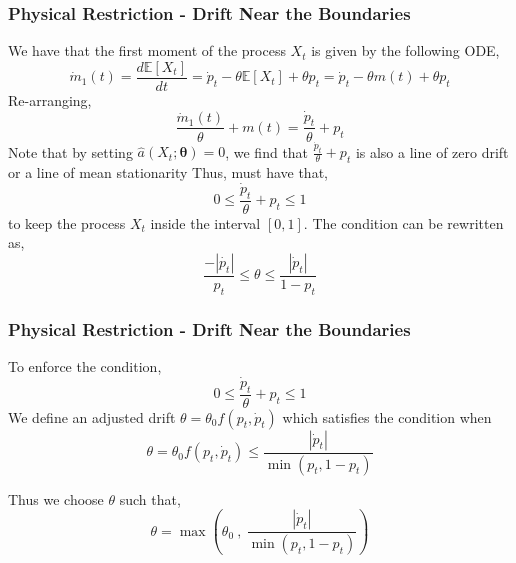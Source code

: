 \documentclass[aspectratio=169]{beamer}\usepackage[utf8]{inputenc}
\newcommand{\E}{\mathbb{E}}
\begin{document}
\begin{frame}\frametitle{ Physical  Restriction - Drift Near the Boundaries}
We have that the first moment of the process $X_t$ is given by the following ODE, 
\begin{equation}
\dot{m}_1 (t) = \frac{d \E[ X_t] }{d t} = \dot{p}_t- \theta \E [ X_t ]  + \theta p_t =   \dot{p}_t- \theta m(t) + \theta p_t
\end{equation}
Re-arranging, 
\begin{equation}
\frac{\dot{m}_1 (t)}{\theta}  + m(t)=   \frac{\dot{p}_t}{\theta}  + p_t 
\end{equation}
Note that by setting $\hat{a}(X_t; \bm{\theta}) =0$, we find that  $ \frac{\dot{p}_t}{\theta}  + p_t $ is also a line of zero drift or a line of mean stationarity 
Thus, must have that, 
\begin{equation}
 0 \leq  \frac{\dot{p}_t}{\theta}  + p_t  \leq 1
\end{equation}
to keep the process $X_t$ inside the interval $[0,1]$.
The condition  can be rewritten as, 
\begin{equation}
\frac{- |\dot{p_t}|}{p_t} \leq \theta \leq \frac{|\dot{p}_t|}{1- p_t}
\end{equation}
\end{frame}


\begin{frame}\frametitle{ Physical  Restriction - Drift Near the Boundaries}
To enforce the condition, 
\begin{equation}
 0 \leq  \frac{\dot{p}_t}{\theta}  + p_t  \leq 1
 \label{cond_drift}
\end{equation}
We  define an adjusted drift $\theta = \theta_0 f( p_t, \dot{p}_t) $  which satisfies the condition when
\begin{equation}
\theta = \theta_0 f( p_t, \dot{p}_t) \leq \frac{|\dot{p}_t|}{\min (p_t, 1-p_t)} 
\end{equation}

Thus we choose $\theta$ such that,
\begin{equation}
\theta = \max \left( \theta_0 \ , \ \frac{|\dot{p}_t|}{\min (p_t, 1-p_t)}  \right )
\end{equation}

\end{frame}
\end{document}
